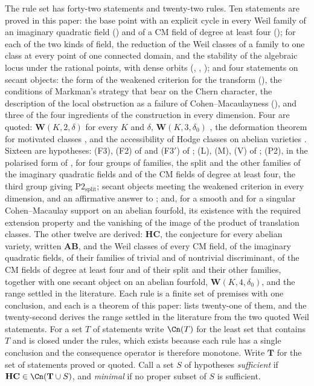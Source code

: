\begin{setupenv}\label{setup:rules}
The rule set has forty-two statements and twenty-two rules. Ten statements
are proved in this paper: the base point with an explicit cycle in every Weil
family of an imaginary quadratic field (\cite[Theorem~15.27]{paperI}) and of a CM
field of degree at least four (\cite[Theorem~17.5]{paperI}); for each of the two
kinds of field, the reduction of the Weil classes of a family to one class at
every point of one connected domain, and the stability of the algebraic locus
under the rational points, with dense orbits (\cite[Section~12]{paperI},
\cite[Proposition~16.7]{paperI}, \cite[Theorem~17.7]{paperI}); and four statements on
secant objects: the form of the weakened criterion for the transform
(\cite[Theorem~4.56]{paperII}), the conditions of Markman's strategy that bear on the
Chern character, the description of the local obstruction as a failure of
Cohen--Macaulayness (\cite[Corollary~4.77]{paperII}), and three of the four
ingredients of the construction in every dimension. Four are quoted:
$\mathbf{W}(K,2,\delta)$ for every $K$ and $\delta$, $\mathbf{W}(K,3,\delta_{0})$
\cite{Mar25a,Mar25b}, the deformation theorem for motivated classes
\cite[Th\'eor\`eme~0.5]{And96b}, and the accessibility of Hodge classes on
abelian varieties \cite[\S5.1, Theorem~3]{Mil20}. Sixteen are hypotheses:
(F3), (F2) of  and (F3$'$) of ;
(L), (M), (V) of ; (P2), in the polarised form of
\cite[Remark~3.6]{paperII}, for four groups of families, the split and the other
families of the imaginary quadratic fields and of the CM fields of degree at
least four, the third group giving $\mathrm{P2}_{\mathrm{split}}$; secant
objects meeting the weakened criterion in every dimension, and an affirmative
answer to \cite[Question~11.4]{Mar25b}; and, for a smooth and for a singular
Cohen--Macaulay support on an abelian fourfold, its existence with the
required extension property and the vanishing of the image of the product of
translation classes. The other twelve are derived: $\mathbf{HC}$, the
conjecture for every abelian variety, written $\mathbf{AB}$, and the Weil
classes of every CM field, of the imaginary quadratic fields, of their
families of trivial and of nontrivial discriminant, of the CM fields of
degree at least four and of their split and their other families, together
with one secant object on an abelian fourfold, $\mathbf{W}(K,4,\delta_{0})$,
and the range settled in the literature. Each rule is a finite set of
premises with one conclusion, and each is a theorem of this paper:
 lists twenty-one of them, and the twenty-second derives the
range settled in the literature from the two quoted Weil statements. For a
set $T$ of statements write $\Cn(T)$ for the least set that contains $T$ and
is closed under the rules, which exists because each rule has a single
conclusion and the consequence operator is therefore monotone. Write
$\mathbf{T}$ for the set of statements proved or quoted. Call a set $S$ of
hypotheses \emph{sufficient} if $\mathbf{HC}\in\Cn(\mathbf{T}\cup S)$, and
\emph{minimal} if no proper subset of $S$ is sufficient.
\end{setupenv}

